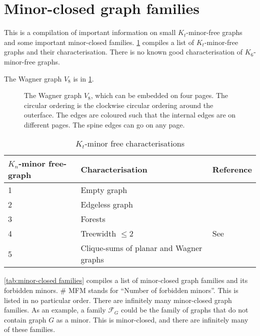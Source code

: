 \section{Minor-closed graph families}\label{sec:minor_closed_families}
This is a compilation of important information on small $K_t$-minor-free graphs and some important minor-closed families. \cref{tab:kt_minor_free} compiles a list of $K_t$-minor-free graphs and their characterisation. There is no known good characterisation of $K_6$-minor-free graphs. 

The Wagner graph $V_8$ is in \cref{fig:wagner}. 
\begin{figure}[h!]
	\centering
	\begin{tikzpicture}[thick,scale=1.5, every node/.style={scale=2}]
		
	\end{tikzpicture}
	\caption[Wagner graph]{The Wagner graph $V_8$, which can be embedded on four pages. The circular ordering is the clockwise circular ordering around the outerface. The edges are coloured such that the internal edges are on different pages. The spine edges can go on any page.}\label{fig:wagner}
\end{figure}

\begin{table}[h!]
    \centering
    \caption{$K_t$-minor free characterisations}\label{tab:kt_minor_free}
    \begin{tabular*}{\textwidth}{@{}lll@{}}
        \toprule
        $K_n$-minor free-graph  & Characterisation  & Reference \\
        \midrule
        1                       & Empty graph       &           \\
        2                       & Edgeless graph    &           \\
        3                       & Forests           &           \\
        4                       & Treewidth $\leq 2$&  See {\textcite{norinMath599GraphMinors2017}}         \\
        5                       & Clique-sums of planar and Wagner graphs & {\textcite{wagnerUeberEigenschaftEbenen1937}}\\
        \bottomrule
    \end{tabular*}
\end{table}

\cref{tab:minor-closed families} compiles a list of minor-closed graph families and its forbidden minors. \# MFM stands for ``Number of forbidden minors''.
This is listed in no particular order. There are infinitely many minor-closed graph families. As an example, a family $\mathcal{F}_G$ could be the family of graphs that do not contain graph $G$ as a minor. This is minor-closed, and there are infinitely many of these families.

